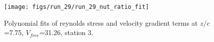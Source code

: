 \begin{figure}[H]
\centering
\texttt{[image: figs/run\_29/run\_29\_nut\_ratio\_fit]}
\caption{Polynomial fits of reynolds stress and velocity gradient terms at $z/c$=7.75, $V_{free}$=31.26, station 3.}
\label{fig:run_29_nut_ratio_fit}
\end{figure}


